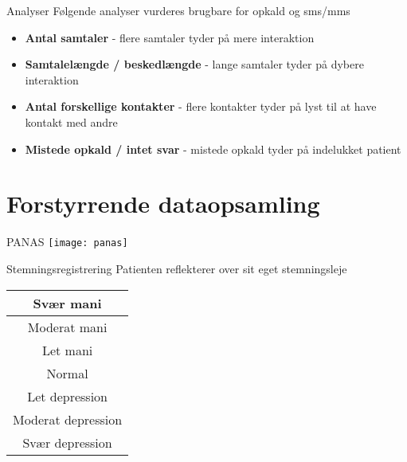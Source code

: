 { %
\begin{frame}{Analyser} %
Følgende analyser vurderes brugbare for opkald og sms/mms
\begin{itemize}
	\item \textbf{Antal samtaler} - flere samtaler tyder på mere interaktion
	\item \textbf{Samtalelængde / beskedlængde} - lange samtaler tyder på dybere interaktion
	\item \textbf{Antal forskellige kontakter} - flere kontakter tyder på lyst til at have kontakt med andre
	\item \textbf{Mistede opkald / intet svar} - mistede opkald tyder på indelukket patient
\end{itemize}
	
\end{frame}}

\section{Forstyrrende dataopsamling}

{ %
\begin{frame}{PANAS} %
\texttt{[image: panas]}
	
\end{frame}}

{ %
	\begin{frame}{Stemningsregistrering} %
		Patienten reflekterer over sit eget stemningsleje
		
		\begin{center}
		\begin{tabular}{|c|}
			\hline \cellcolor{red!90} Svær mani \\ 
			\hline \cellcolor{red!60} Moderat mani \\ 
			\hline \cellcolor{red!30} Let mani \\ 
			\hline \cellcolor{yellow!70} Normal \\ 
			\hline \cellcolor{blue!30} Let depression \\ 
			\hline \cellcolor{blue!60} Moderat depression \\ 
			\hline \cellcolor{blue!90} Svær depression \\ 
			\hline 
		\end{tabular} 
		\end{center}
	\end{frame}}
	
